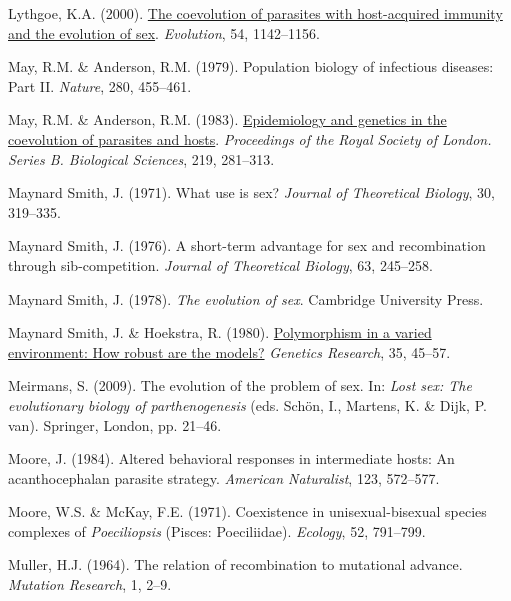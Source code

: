 \documentclass[
  american,
  letterpaper,
]{book}
\newlength{\cslhangindent}
\newenvironment{CSLReferences}[2] %
 {\begin{list}{}{%
  \setlength{\itemindent}{0pt}
  \setlength{\leftmargin}{0pt}
  \setlength{\parsep}{0pt}
  \ifodd #1
   \setlength{\leftmargin}{\cslhangindent}
   \setlength{\itemindent}{-1\cslhangindent}
  \fi
  \setlength{\itemsep}{#2\baselineskip}}}
 {\end{list}}
\begin{document}
\begin{CSLReferences}{1}{0}
Lythgoe, K.A. (2000).
\href{https://doi.org/10.1111/j.0014-3820.2000.tb00550.x}{The
coevolution of parasites with host-acquired immunity and the evolution
of sex}. \emph{Evolution}, 54, 1142--1156.

May, R.M. \& Anderson, R.M. (1979). Population biology of infectious
diseases: Part II. \emph{Nature}, 280, 455--461.

May, R.M. \& Anderson, R.M. (1983).
\href{https://doi.org/10.1098/rspb.1983.0075}{Epidemiology and genetics
in the coevolution of parasites and hosts}. \emph{Proceedings of the
Royal Society of London. Series B. Biological Sciences}, 219, 281--313.

Maynard Smith, J. (1971). What use is sex? \emph{Journal of Theoretical
Biology}, 30, 319--335.

Maynard Smith, J. (1976). A short-term advantage for sex and
recombination through sib-competition. \emph{Journal of Theoretical
Biology}, 63, 245--258.

Maynard Smith, J. (1978). \emph{The evolution of sex}. Cambridge
University Press.

Maynard Smith, J. \& Hoekstra, R. (1980).
\href{https://doi.org/10.1017/S0016672300013926}{Polymorphism in a
varied environment: How robust are the models?} \emph{Genetics
Research}, 35, 45--57.

Meirmans, S. (2009). The evolution of the problem of sex. In: \emph{Lost
sex: The evolutionary biology of parthenogenesis} (eds. Schön, I.,
Martens, K. \& Dijk, P. van). Springer, London, pp. 21--46.

Moore, J. (1984). Altered behavioral responses in intermediate hosts: An
acanthocephalan parasite strategy. \emph{American Naturalist}, 123,
572--577.

Moore, W.S. \& McKay, F.E. (1971). Coexistence in unisexual-bisexual
species complexes of \emph{{P}oeciliopsis} ({Pisces: Poeciliidae}).
\emph{Ecology}, 52, 791--799.

Muller, H.J. (1964). The relation of recombination to mutational
advance. \emph{Mutation Research}, 1, 2--9.


\end{CSLReferences}
\end{document}
